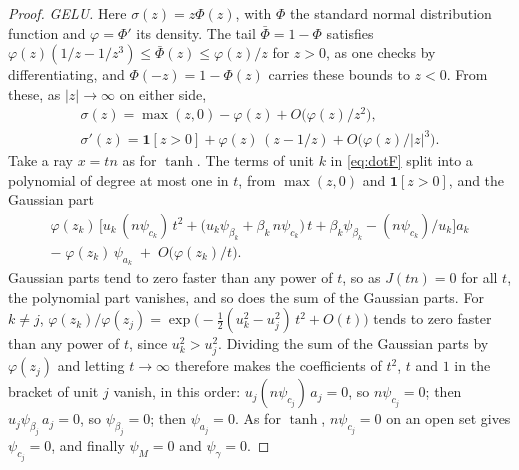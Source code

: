 \documentclass[10pt]{article}
\theoremstyle{definition}
\theoremstyle{remark}
\newenvironment{nested}{\par\nopagebreak\def\FrameCommand{\hspace{0.5em}{\color{black!30}\vrule width 0.6pt}\hspace{1em}}\MakeFramed{\advance\hsize-\width\FrameRestore}}{\endMakeFramed}
\begin{document}
\begin{nested}
\begin{proof}
\emph{GELU.} Here $\sigma(z) = z\Phi(z)$, with $\Phi$ the standard normal distribution function and $\varphi = \Phi'$ its density. The tail $\bar\Phi = 1 - \Phi$ satisfies $\varphi(z)(1/z - 1/z^3) \le \bar\Phi(z) \le \varphi(z)/z$ for $z > 0$, as one checks by differentiating, and $\Phi(-z) = 1 - \Phi(z)$ carries these bounds to $z < 0$. From these, as $\lvert z\rvert \to \infty$ on either side,
\begin{gather*}
\sigma(z) = \max(z, 0) - \varphi(z) + O\big(\varphi(z)/z^2\big),\\
\sigma'(z) = \mathbf 1[z > 0] + \varphi(z)\,(z - 1/z) + O\big(\varphi(z)/\lvert z\rvert^3\big).
\end{gather*}
Take a ray $x = tn$ as for $\tanh$. The terms of unit $k$ in \cref{eq:dotF} split into a polynomial of degree at most one in $t$, from $\max(z, 0)$ and $\mathbf 1[z > 0]$, and the Gaussian part
\begin{multline*}
\varphi(z_k)\,\Big[u_k\,(n\psi_{c_k})\,t^2 + \big(u_k\psi_{\beta_k} + \beta_k\,n\psi_{c_k}\big)\,t + \beta_k\psi_{\beta_k} - (n\psi_{c_k})/u_k\Big]a_k\\
-\; \varphi(z_k)\,\psi_{a_k} \;+\; O\big(\varphi(z_k)/t\big).
\end{multline*}
Gaussian parts tend to zero faster than any power of $t$, so as $J(tn) = 0$ for all $t$, the polynomial part vanishes, and so does the sum of the Gaussian parts. For $k \neq j$, $\varphi(z_k)/\varphi(z_j) = \exp\big(-\tfrac12(u_k^2 - u_j^2)\,t^2 + O(t)\big)$ tends to zero faster than any power of $t$, since $u_k^2 > u_j^2$. Dividing the sum of the Gaussian parts by $\varphi(z_j)$ and letting $t \to \infty$ therefore makes the coefficients of $t^2$, $t$ and $1$ in the bracket of unit $j$ vanish, in this order: $u_j(n\psi_{c_j})\,a_j = 0$, so $n\psi_{c_j} = 0$; then $u_j\psi_{\beta_j}\,a_j = 0$, so $\psi_{\beta_j} = 0$; then $\psi_{a_j} = 0$. As for $\tanh$, $n\psi_{c_j} = 0$ on an open set gives $\psi_{c_j} = 0$, and finally $\psi_M = 0$ and $\psi_\gamma = 0$.


\end{proof}
\end{nested}
\end{document}
